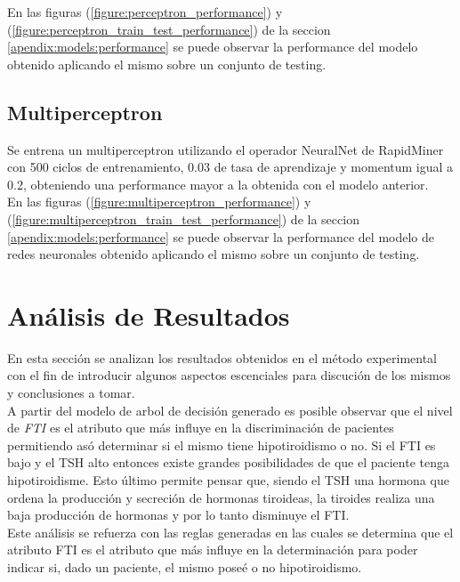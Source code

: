 \documentclass[osajnl,twocolumn,showpacs,superscriptaddress,10pt,floatfix]{revtex4-1} %
\begin{document}
En las figuras (\ref{figure:perceptron_performance}) y (\ref{figure:perceptron_train_test_performance}) de la seccion \ref{apendix:models:performance} se puede observar la performance del modelo obtenido aplicando el mismo sobre un conjunto de testing. \\

\subsection{Multiperceptron}

Se entrena un multiperceptron utilizando el operador NeuralNet de RapidMiner con 500 ciclos de entrenamiento, 0.03 de tasa de aprendizaje y momentum igual a 0.2, obteniendo una performance mayor a la obtenida con el modelo anterior. \\

En las figuras (\ref{figure:multiperceptron_performance}) y (\ref{figure:multiperceptron_train_test_performance}) de la seccion \ref{apendix:models:performance} se puede observar la performance del modelo de redes neuronales obtenido aplicando el mismo sobre un conjunto de testing. \\

\section{Análisis de Resultados} \label{section:results_analysis}

En esta sección se analizan los resultados obtenidos en el método experimental con el fin de introducir algunos aspectos escenciales para discución de los mismos y conclusiones a tomar. \\

A partir del modelo de arbol de decisión generado es posible observar que el nivel de \textit{FTI} es el atributo que más influye en la discriminación de pacientes permitiendo asó determinar si el mismo tiene hipotiroidismo o no. Si el FTI es bajo y el TSH alto entonces existe grandes posibilidades de que el paciente tenga hipotiroidisme. Esto último permite pensar que, siendo el TSH una hormona que ordena la producción y secreción de hormonas tiroideas, la tiroides realiza una baja producción de hormonas y por lo tanto disminuye el FTI. \\

Este análisis se refuerza con las reglas generadas en las cuales se determina que el atributo FTI es el atributo que más influye en la determinación para poder indicar si, dado un paciente, el mismo poseé o no hipotiroidismo. \\
\end{document}

